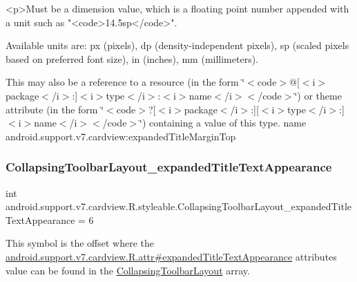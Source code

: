 \begin{DoxyVerb}      <p>Must be a dimension value, which is a floating point number appended with a unit such as "<code>14.5sp</code>".
\end{DoxyVerb}
 Available units are\+: px (pixels), dp (density-\/independent pixels), sp (scaled pixels based on preferred font size), in (inches), mm (millimeters). 

This may also be a reference to a resource (in the form \char`\"{}$<$code$>$@\mbox{[}$<$i$>$package$<$/i$>$\+:\mbox{]}$<$i$>$type$<$/i$>$\+:$<$i$>$name$<$/i$>$$<$/code$>$\char`\"{}) or theme attribute (in the form \char`\"{}$<$code$>$?\mbox{[}$<$i$>$package$<$/i$>$\+:\mbox{]}\mbox{[}$<$i$>$type$<$/i$>$\+:\mbox{]}$<$i$>$name$<$/i$>$$<$/code$>$\char`\"{}) containing a value of this type.  name android.\+support.\+v7.\+cardview\+:expanded\+Title\+Margin\+Top \mbox{\label{classandroid_1_1support_1_1v7_1_1cardview_1_1R_1_1styleable_a216b5b490333f10034ece0d07367bcf2}} 
\subsubsection{\texorpdfstring{Collapsing\+Toolbar\+Layout\+\_\+expanded\+Title\+Text\+Appearance}{CollapsingToolbarLayout\_expandedTitleTextAppearance}}
{\footnotesize\ttfamily int android.\+support.\+v7.\+cardview.\+R.\+styleable.\+Collapsing\+Toolbar\+Layout\+\_\+expanded\+Title\+Text\+Appearance = 6\hspace{0.3cm}{\ttfamily [static]}}

This symbol is the offset where the \hyperlink{classandroid_1_1support_1_1v7_1_1cardview_1_1R_1_1attr_a584d2e618ca9dda1b87ba8c0f9a707ba}{android.\+support.\+v7.\+cardview.\+R.\+attr\#expanded\+Title\+Text\+Appearance} attribute\textquotesingle{}s value can be found in the \hyperlink{classandroid_1_1support_1_1v7_1_1cardview_1_1R_1_1styleable_a3b4c5393d0c99cb4e5a7a3911fc606b4}{Collapsing\+Toolbar\+Layout} array.

